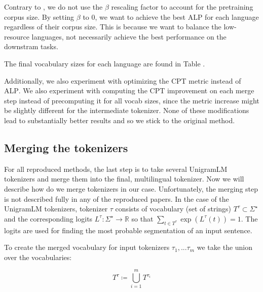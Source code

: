 Contrary to \citet{zheng_allocating_2021}, we do not use the $\beta$ rescaling factor to account for the pretraining corpus size. By setting $\beta$ to 0, we want to achieve the best ALP for each language regardless of their corpus size. This is because we want to balance the low-resource languages, not necessarily achieve the best performance on the downstram tasks.

The final vocabulary sizes for each language are found in Table .

Additionally, we also experiment with optimizing the \textsc{CPT} metric instead of \textsc{ALP}. We also experiment with computing the \textsc{CPT} improvement on each merge step instead of precomputing it for all vocab sizes, since the metric increase might be slightly different for the intermediate tokenizer. None of these modifications lead to substantially better results and so we stick to the original method. 

\subsection{Merging the tokenizers}


For all reproduced methods, the last step is to take several UnigramLM tokenizers and merge them into the final, multilingual tokenizer. Now we will describe how do we merge tokenizers in our case. Unfortunately, the merging step is not described fully in any of the reproduced papers. In the case of the UnigramLM tokenizers, tokenizer $\tau$ consists of vocabulary (set of strings) $T^\tau \subset \Sigma^\star$ and the corresponding logits $L^\tau: \Sigma^\star \rightarrow \mathbb{R}$ so that $\sum_{t \in T^\tau} \exp(L^\tau(t)) = 1$.  The logits are used for finding the most probable segmentation of an input sentence. 

To create the merged vocabulary for input tokenizers $\tau_1, ... \tau_m$ we take the union over the vocabularies:

\begin{equation}
    T^\tau \coloneqq \bigcup_{i=1}^m T^{\tau_i}
\end{equation}

